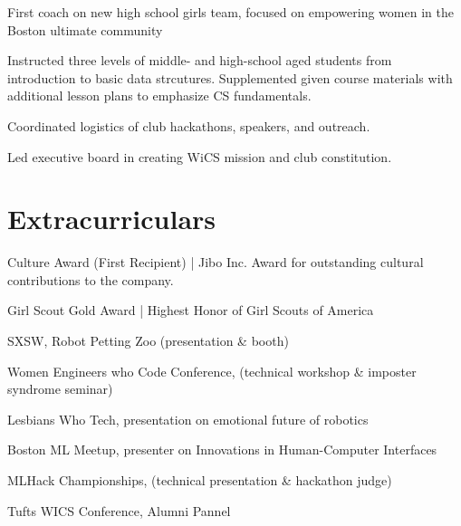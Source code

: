 \documentclass[]{csaund_resume-openfont}
\begin{document}
First coach on new high school girls team, focused on empowering women in the Boston ultimate community
\sectionsep

Instructed three levels of middle- and high-school aged students from introduction to basic data strcutures. Supplemented given course materials with additional lesson plans to emphasize CS fundamentals.
\sectionsep

\begin{tightemize}
\item Coordinated logistics of club hackathons, speakers, and outreach.
\item Led executive board in creating WiCS mission and club constitution.
\end{tightemize}
\sectionsep


\section{Extracurriculars}
\descript{ }
\begin{tightemize}
\item Culture Award (First Recipient) | Jibo Inc. Award for outstanding cultural contributions to the company.
\item Girl Scout Gold Award | Highest Honor of Girl Scouts of America
\end{tightemize}
\sectionsep

\descript {}
\begin{tightemize}
\item SXSW, Robot Petting Zoo (presentation \& booth)
\item Women Engineers who Code Conference, (technical workshop \& imposter syndrome seminar)
\item Lesbians Who Tech, presentation on emotional future of robotics 
\item Boston ML Meetup, presenter on Innovations in Human-Computer Interfaces
\item MLHack Championships, (technical presentation \& hackathon judge)
\item Tufts WICS Conference, Alumni Pannel 
\end{tightemize}
\sectionsep
\end{document}
